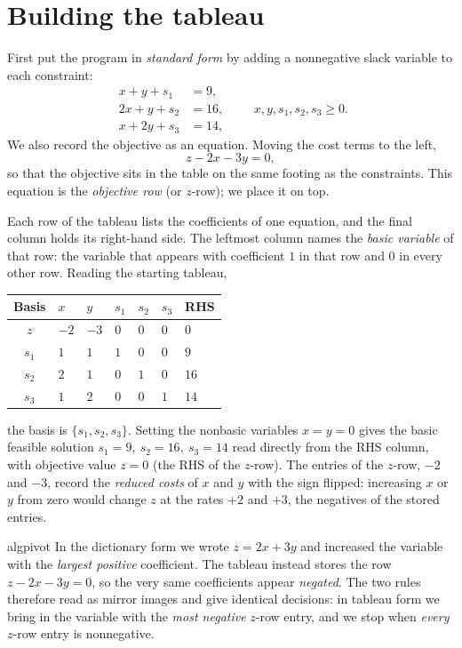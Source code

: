 \section{Building the tableau}
\label{sec:tableau-building}

First put the program in \emph{standard form} by adding a nonnegative slack variable to each constraint:
\begin{equation*}
\begin{aligned}
x + y  + s_1 &= 9,\\
2x + y + s_2 &= 16,\\
x + 2y + s_3 &= 14,
\end{aligned}
\qquad x,y,s_1,s_2,s_3 \ge 0.
\end{equation*}
We also record the objective as an equation. Moving the cost terms to the left,
\[
z - 2x - 3y = 0,
\]
so that the objective sits in the table on the same footing as the constraints. This equation is the \emph{objective row} (or $z$-row); we place it on top.

Each row of the tableau lists the coefficients of one equation, and the final column holds its right-hand side. The leftmost column names the \emph{basic variable} of that row: the variable that appears with coefficient $1$ in that row and $0$ in every other row. Reading the starting tableau,
\begin{center}
\renewcommand{\arraystretch}{1.3}
\begin{tabular}{c|ZZZZZ|Z}
\toprule
Basis & $x$ & $y$ & $s_1$ & $s_2$ & $s_3$ & RHS\\
\midrule
$z$   & $-2$ & $-3$ & $0$ & $0$ & $0$ & $0$\\
\midrule
$s_1$ & $1$ & $1$ & $1$ & $0$ & $0$ & $9$\\
$s_2$ & $2$ & $1$ & $0$ & $1$ & $0$ & $16$\\
$s_3$ & $1$ & $2$ & $0$ & $0$ & $1$ & $14$\\
\bottomrule
\end{tabular}
\end{center}
the basis is $\{s_1,s_2,s_3\}$. Setting the nonbasic variables $x=y=0$ gives the basic feasible solution $s_1=9,\ s_2=16,\ s_3=14$ read directly from the RHS column, with objective value $z=0$ (the RHS of the $z$-row). The entries of the $z$-row, $-2$ and $-3$, record the \emph{reduced costs} of $x$ and $y$ with the sign flipped: increasing $x$ or $y$ from zero would change $z$ at the rates $+2$ and $+3$, the negatives of the stored entries.

\begin{steppanel}{algpivot}
\label{panel:tableau-sign-convention}%
 In the dictionary form we wrote $z = 2x + 3y$ and increased the variable with the \emph{largest positive} coefficient. The tableau instead stores the row $z - 2x - 3y = 0$, so the very same coefficients appear \emph{negated}. The two rules therefore read as mirror images and give identical decisions: in tableau form we bring in the variable with the \emph{most negative} $z$-row entry, and we stop when \emph{every} $z$-row entry is nonnegative.
\end{steppanel}

